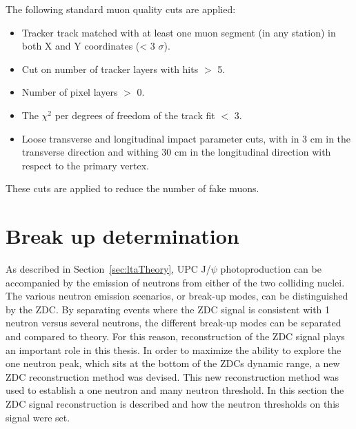       The following standard muon quality cuts are applied:
      \begin{itemize}
        \item Tracker track matched with at least one muon segment 
          (in any station) in both X and Y coordinates (< 3 $\sigma$).
        \item Cut on number of tracker layers with hits $>$ 5.
        \item Number of pixel layers $>$ 0.
        \item The $\chi^{2}$ per degrees of freedom of the track fit $<$ 3. 
        \item Loose transverse and longitudinal impact parameter cuts, with in 3 
          cm in the transverse direction and withing 30 cm in the longitudinal 
          direction with respect to the primary vertex.
      \end{itemize}
      These cuts are applied to reduce the number of fake muons.

  \section{\label{sec:breakUpDet} Break up determination}
    As described in Section\DIFdelbegin {}\DIFdelend ~\ref{sec:ltaTheory}, UPC J/$\psi$ photoproduction 
      can be accompanied by the emission of neutrons from either of the two 
      colliding nuclei.
    The various neutron emission scenarios, or break-up \DIFdelbegin {}\DIFdelend modes, can 
      be distinguished by the ZDC.
    By separating events where the ZDC signal is consistent with 1 neutron 
      versus several neutrons, the different break-up modes can be separated
      and compared to theory. 
    For this reason, reconstruction of the ZDC signal plays an important role 
      in this thesis. 
    In order to maximize the ability to explore the one neutron peak, which 
      sits at the bottom of the ZDCs dynamic range, a new ZDC reconstruction 
      method was devised. 
    This new reconstruction method was \DIFdelbegin {}\DIFdelend \DIFaddbegin {}\DIFaddend used to establish a one neutron and
      many neutron threshold.
    In this section the ZDC signal reconstruction is described and how the 
      neutron thresholds on this signal were set.

